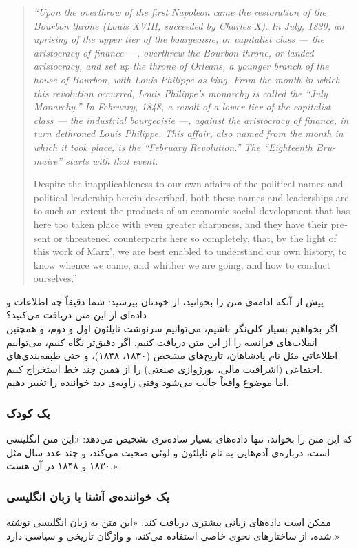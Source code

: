 \begin{latin}
\begin{quote}
\itshape
``Upon the overthrow of the first Napoleon came the restoration of the Bourbon throne (Louis XVIII, succeeded by Charles X). In July, 1830, an uprising of the upper tier of the bourgeoisie, or capitalist class --- the aristocracy of finance ---, overthrew the Bourbon throne, or landed aristocracy, and set up the throne of Orleans, a younger branch of the house of Bourbon, with Louis Philippe as king. From the month in which this revolution occurred, Louis Philippe's monarchy is called the ``July Monarchy.'' In February, 1848, a revolt of a lower tier of the capitalist class --- the industrial bourgeoisie ---, against the aristocracy of finance, in turn dethroned Louis Philippe. This affair, also named from the month in which it took place, is the ``February Revolution.'' The ``Eighteenth Brumaire'' starts with that event.

Despite the inapplicableness to our own affairs of the political names and political leadership herein described, both these names and leaderships are to such an extent the products of an economic-social development that has here too taken place with even greater sharpness, and they have their present or threatened counterparts here so completely, that, by the light of this work of Marx', we are best enabled to understand our own history, to know whence we came, and whither we are going, and how to conduct ourselves.''
\end{quote}
\end{latin}
پیش از آنکه ادامه‌ی متن را بخوانید، از خودتان بپرسید: شما دقیقاً چه اطلاعات و داده‌ای از این متن دریافت می‌کنید؟\\
اگر بخواهیم بسیار کلی‌نگر باشیم، می‌توانیم سرنوشت ناپلئون اول و دوم، و همچنین انقلاب‌های فرانسه را از این متن دریافت کنیم. اگر دقیق‌تر نگاه کنیم، می‌توانیم اطلاعاتی مثل نام پادشاهان، تاریخ‌های مشخص (۱۸۳۰، ۱۸۴۸)، و حتی طبقه‌بندی‌های اجتماعی (اشرافیت مالی، بورژوازی صنعتی) را از همین چند خط استخراج کنیم.\\
اما موضوع واقعاً جالب می‌شود وقتی زاویه‌ی دید خواننده را تغییر دهیم.
\subsubsection{یک کودک}
که این متن را بخواند، تنها داده‌های بسیار ساده‌تری تشخیص می‌دهد: «این متن انگلیسی است، درباره‌ی آدم‌هایی به نام ناپلئون و لوئی صحبت می‌کند، و چند عدد سال مثل ۱۸۳۰ و ۱۸۴۸ در آن هست.»
\subsubsection{یک خواننده‌ی آشنا با زبان انگلیسی}
ممکن است داده‌های زبانی بیشتری دریافت کند: «این متن به زبان انگلیسی نوشته شده، از ساختارهای نحوی خاصی استفاده می‌کند، و واژگان تاریخی و سیاسی دارد.»


